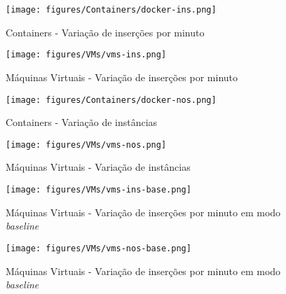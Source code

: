 \begin{center}

	\begin{figure}[H]
		\texttt{[image: figures/Containers/docker-ins.png]}
		\caption{Containers - Variação de inserções por minuto}
		\label{fig:docker-ins}
	\end{figure}

		\begin{figure}[H]
			\texttt{[image: figures/VMs/vms-ins.png]}
			\caption{Máquinas Virtuais - Variação de inserções por minuto}
			\label{fig:vms-ins}
		\end{figure}



		\begin{figure}[H]
			\texttt{[image: figures/Containers/docker-nos.png]}
			\caption{Containers - Variação de instâncias}
			\label{fig:docker-nos}
		\end{figure}

		\begin{figure}[H]
			\texttt{[image: figures/VMs/vms-nos.png]}
			\caption{Máquinas Virtuais - Variação de instâncias}
			\label{fig:vms-nos}
		\end{figure}


		\begin{comment}

		\begin{figure}[H]
			\texttt{[image: figures/Containers/docker-ins-base.png]}
			\caption{Containers - Variação de inserções por minuto em modo \textit{baseline}}
			\label{fig:docker-ins-base}
		\end{figure}

		\end{comment}

		\begin{figure}[H]
			\texttt{[image: figures/VMs/vms-ins-base.png]}
			\caption{Máquinas Virtuais - Variação de inserções por minuto em modo \textit{baseline}}
			\label{fig:vms-ins-base}
		\end{figure}



		\begin{comment}

		\begin{figure}[H]
			\texttt{[image: figures/Containers/docker-nos-base.png]}
			\caption{Containers - Variação de inserções por minuto em modo \textit{baseline}}
			\label{fig:docker-ins-base}
		\end{figure}
		
		\end{comment}

		\begin{figure}[H]
			\texttt{[image: figures/VMs/vms-nos-base.png]}
			\caption{Máquinas Virtuais - Variação de inserções por minuto em modo \textit{baseline}}
			\label{fig:vms-ins-base}
		\end{figure}



\end{center}

